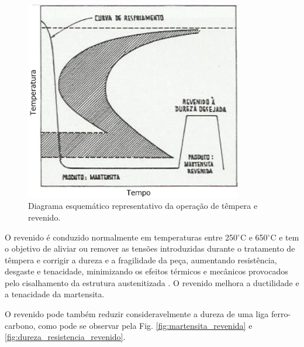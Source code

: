 \documentclass[
12pt,
openany, %
oneside, %
a4paper,			
english,			
brazil			        %
]{abntbibufjf}
\begin{document}
	\begin{figure}[H]
		\centering
		\includegraphics[width=0.85\textwidth]{revenido}
		\caption{Diagrama esquemático representativo da operação de têmpera e revenido. \cite{chiaverini2003tratamentos}}
		\label{fig:revenido}
	\end{figure}

	O revenido é conduzido normalmente em temperaturas entre 250$^{\circ}$C e 650$^{\circ}$C \cite{callister2011materials} e tem o objetivo de aliviar ou remover as tensões introduzidas durante o tratamento de têmpera e corrigir a dureza e a fragilidade da peça, aumentando resistência, desgaste e tenacidade, minimizando os efeitos térmicos e mecânicos provocados pelo cisalhamento da estrutura austenitizada \cite{vale2016tratamento}. O revenido melhora a ductilidade e a tenacidade da martensita.
	
	O revenido pode também reduzir consideravelmente a dureza de uma liga ferro-carbono, como pode se observar pela Fig. \ref{fig:martensita_revenida} e \ref{fig:dureza_resistencia_revenido}.
	
\end{document}
